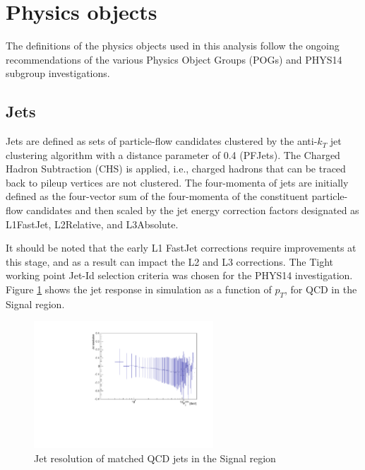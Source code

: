 \section{Physics objects}
\label{sec:objects}
The definitions of the physics objects used in this analysis follow the ongoing recommendations of the various Physics Object Groups (POGs) and PHYS14 subgroup investigations. 

\subsection{Jets}
\label{sec:jetreco}
Jets are defined as sets of particle-flow candidates clustered by the
anti-$k_{T}$ jet clustering algorithm with a distance parameter of 0.4
(PFJets). The Charged Hadron Subtraction (CHS) is applied, i.e., charged
hadrons that can be traced back to pileup vertices are not clustered.
The four-momenta of jets are initially defined as the four-vector sum of
the four-momenta of the constituent particle-flow candidates and then
scaled by the jet energy correction factors designated as L1FastJet,
L2Relative, and L3Absolute.

It should be noted that the early L1 FastJet corrections require
improvements at this stage, and as a result can impact the L2 and L3
corrections. The Tight working point Jet-Id selection criteria was
chosen for the PHYS14 investigation. Figure \ref{fig:QCDJets} shows the
jet response in simulation as a function of $p_{T}$, for QCD in the Signal region.

\begin{figure}[h]
  \centering
  \includegraphics[width=0.6\textwidth]{figures/PhysicsObjectsPlots/JetResolutionSigQCD.pdf}
  \caption{Jet resolution of matched QCD jets in the Signal region}
  \label{fig:QCDJets}
\end{figure}
   
  

